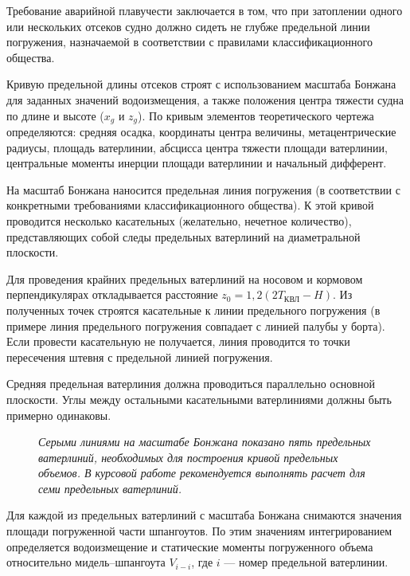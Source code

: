 Требование аварийной плавучести заключается в том, что при затоплении одного или нескольких отсеков судно должно сидеть не глубже предельной линии погружения, назначаемой в соответствии с правилами классификационного общества.

Кривую предельной длины отсеков строят с использованием масштаба Бонжана для заданных значений водоизмещения, а также положения центра тяжести судна по длине и высоте ($x_g$ и $z_g$).
По кривым элементов теоретического чертежа определяются: средняя осадка, координаты центра величины, метацентрические радиусы, площадь ватерлинии, абсцисса центра тяжести площади ватерлинии, центральные моменты инерции площади ватерлинии и начальный дифферент.

На масштаб Бонжана наносится предельная линия погружения (в соответствии с конкретными требованиями классификационного общества).
К этой кривой проводится несколько касательных (желательно, нечетное количество), представляющих собой следы предельных ватерлиний на диаметральной плоскости.

Для проведения крайних предельных ватерлиний на носовом и кормовом перпендикулярах откладывается расстояние $z_0 = 1{,}2(2 T_{\text{КВЛ}} - H)$.
Из полученных точек строятся касательные к линии предельного погружения (в примере линия предельного погружения совпадает с линией палубы у борта).
Если провести касательную не получается, линия проводится то точки пересечения штевня с предельной линией погружения.

Средняя предельная ватерлиния должна проводиться параллельно основной плоскости.
Углы между остальными касательными ватерлиниями должны быть примерно одинаковы.

\begin{figure}[h!]
    \centerline{}
    \caption{К расчету кривой предельных объемов}
    \caption*{\textit{Серыми линиями на масштабе Бонжана показано пять предельных ватерлиний, необходимых для построения кривой предельных объемов.
    В курсовой работе рекомендуется выполнять расчет для семи предельных ватерлиний.}}
    \label{fig:bonjean-volumes}
\end{figure}

Для каждой из предельных ватерлиний с масштаба Бонжана снимаются значения площади погруженной части шпангоутов.
По этим значениям интегрированием определяется водоизмещение и статические моменты погруженного объема относительно мидель–шпангоута $V_{i-i}$, где $i$ --- номер предельной ватерлинии.

